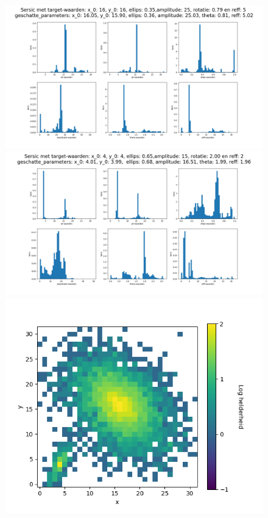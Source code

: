 \begin{figure}
    \begin{minipage}{0.98\linewidth}
        \includegraphics[width=0.95\linewidth]{Figures/1_emcee_hist_5000_750.png}   
        \includegraphics[width=0.95\linewidth]{Figures/2_emcee_hist_5000_750.png}
        \includegraphics[width=0.95\linewidth]{Figures/figuur_2D_zonder_package_25_5_1_0.35_0.7853981633974483_5000.png}

\end{minipage}
\end{figure}
